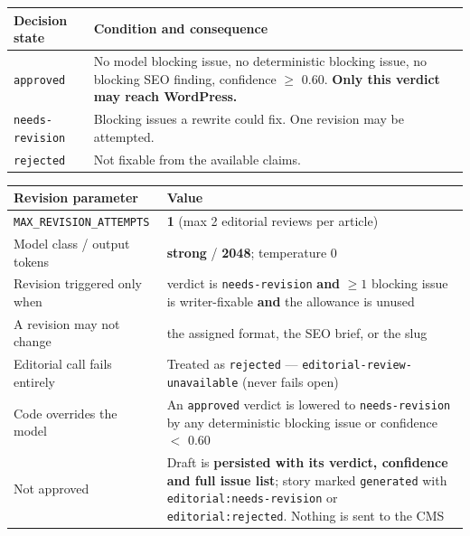 \documentclass[10pt,a4paper]{article}
\newcommand{\cd}[1]{\texttt{\footnotesize\hyphenpenalty=0\exhyphenpenalty=0\relax #1}}
\newcommand{\us}{\_\discretionary{}{}{}}
\begin{document}
\begin{center}\footnotesize
\begin{tabularx}{\textwidth}{@{}l >{\RaggedRight}X@{}}
\toprule
\textbf{Decision state} & \textbf{Condition and consequence} \\
\midrule
\cd{approved} & No model blocking issue, no deterministic blocking issue, no blocking SEO finding, confidence $\geq$ 0.60. \textbf{Only this verdict may reach WordPress.} \\
\cd{needs-revision} & Blocking issues a rewrite could fix. One revision may be attempted. \\
\cd{rejected} & Not fixable from the available claims. \\
\bottomrule
\end{tabularx}
\end{center}

\begin{center}\footnotesize
\begin{tabularx}{\textwidth}{@{}>{\RaggedRight}p{5.4cm} >{\RaggedRight}X@{}}
\toprule
\textbf{Revision parameter} & \textbf{Value} \\
\midrule
\cd{MAX\us REVISION\us ATTEMPTS} & \textbf{1} (max 2 editorial reviews per article) \\
Model class / output tokens & \textbf{strong} / \textbf{2048}; temperature 0 \\
Revision triggered only when & verdict is \cd{needs-revision} \textbf{and} $\geq 1$ blocking issue is writer-fixable \textbf{and} the allowance is unused \\
A revision may not change & the assigned format, the SEO brief, or the slug \\
Editorial call fails entirely & Treated as \cd{rejected} --- \cd{editorial-review-unavailable} (never fails open) \\
Code overrides the model & An \cd{approved} verdict is lowered to \cd{needs-revision} by any deterministic blocking issue or confidence $<$ 0.60 \\
Not approved & Draft is \textbf{persisted with its verdict, confidence and full issue list}; story marked \cd{generated} with \cd{editorial:}\allowbreak\cd{needs-revision} or \cd{editorial:rejected}. Nothing is sent to the CMS \\
\bottomrule
\end{tabularx}
\end{center}

\end{document}
